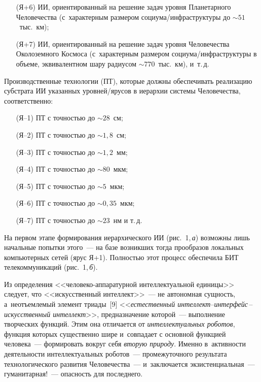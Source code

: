 \begin{multicols}{2}

\noindent
\begin{enumerate}
\item[(Я+6)] ИИ, ориентированный на решение задач уровня Планетарного 
Человечества (с~характерным размером  
со\-ци\-ума/инфра\-струк\-ту\-ры до $\sim 51$~тыс.\ км);
\item[(Я+7)] ИИ, ориентированный на решение задач уровня Человечества 
Околоземного Космоса (с~характерным размером  
со\-ци\-ума/инфра\-струк\-ту\-ры в объеме, эквивалентном шару 
радиусом $\sim 770$~тыс.\ км), и~т.\,д.
     \end{enumerate}
     
     Производственные технологии (ПТ), которые должны обеспечивать 
реализацию субстрата ИИ указанных уров\-ней/яру\-сов в иерархии системы 
Человечества, соответственно:
     \begin{enumerate}[Я--7)]
\item[(Я--1)] ПТ с точностью до $\sim28$~см;
\item[(Я--2)] ПТ с точностью до $\sim 1{,}8$~см;
\item[(Я--3)] ПТ с точностью до $\sim 1{,}2$~мм;
\item[(Я--4)] ПТ с точностью до $\sim 80$~мкм;
\item[(Я--5)] ПТ с точностью до $\sim 5$~мкм;
\item[(Я--6)] ПТ с точностью до $\sim 0{,}35$~мкм;
\item[(Я--7)] ПТ с точностью до $\sim 23$~нм и т.\,д.
\end{enumerate}
  
  На первом этапе формирования иерархического ИИ (рис.~1,\,\textit{а}) 
возможны лишь начальные попытки этого~--- на базе возникших тогда 
прообразов локальных компьютерных сетей (ярус Я+1). Полностью этот 
процесс обеспечила БИТ телекоммуникаций (рис.~1,\,\textit{б}).
  
  Из определения <<человеко-аппаратурной интеллектуальной единицы>> 
следует, что <<искусственный интеллект>>~--- не автономная сущность, 
а~неотъемлемый элемент триады~[9] <<\textit{естественный\linebreak  
ин\-тел\-лект}\;--\;\textit{ин\-тер\-фейс}\,--\,\textit{ис\-кус\-ст\-вен\-ный 
интеллект}>>, предназначение которой~--- выполнение творческих функций. 
Этим она отличается от \textit{интеллектуальных роботов}, функция которых 
существенно шире и~совпадает с основной функцией человека~--- формировать 
вокруг себя \textit{вторую природу}. Именно в~активности деятельности 
интеллектуальных роботов~--- промежуточного результата технологического 
развития Человечества~--- и~заключается экзистенциальная~---  
гуманитарная!~--- опасность для последнего.
  

\end{multicols}
